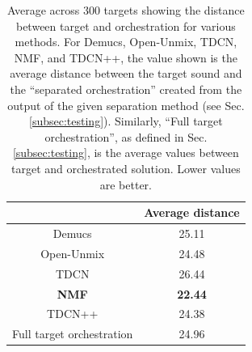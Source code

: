 \documentclass{article}
\begin{document}
  
  \begin{table}
    \begin{center}
      \begin{tabular}{|c|c|}
        \hline
        & Average distance \\
        \hline
        Demucs & 25.11 \\
        \hline
        Open-Unmix & 24.48\\
        \hline
        TDCN & 26.44\\
        \hline
        \textbf{NMF} & \textbf{22.44} \\
        \hline
        TDCN++ & 24.38 \\
        \hline
        Full target orchestration & 24.96 \\
        \hline
      \end{tabular}
    \end{center}
    \caption{Average across 300 targets showing the distance between target and orchestration for various methods. For Demucs, Open-Unmix, TDCN, NMF, and TDCN++, the value shown is the average distance between the target sound and the ``separated orchestration'' created from the output of the given separation method (see Sec. \ref{subsec:testing}). Similarly, ``Full target orchestration'', as defined in Sec. \ref{subsec:testing}, is the average values between target and orchestrated solution. Lower values are better.}
    \label{tab:distances}
  \end{table}
  
  
\end{document}

